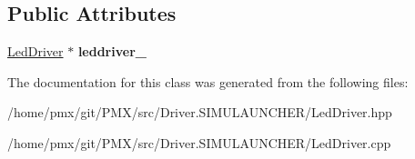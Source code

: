 \subsection*{Public Attributes}
\begin{DoxyCompactItemize}
\item 
\mbox{\label{classLedDriverSDLTask_a3671f9e532a5e7163a8a33d8059b7519}} 
\hyperlink{classLedDriver}{Led\+Driver} $\ast$ {\bfseries leddriver\+\_\+}
\end{DoxyCompactItemize}


The documentation for this class was generated from the following files\+:\begin{DoxyCompactItemize}
\item 
/home/pmx/git/\+P\+M\+X/src/\+Driver.\+S\+I\+M\+U\+L\+A\+U\+N\+C\+H\+E\+R/Led\+Driver.\+hpp\item 
/home/pmx/git/\+P\+M\+X/src/\+Driver.\+S\+I\+M\+U\+L\+A\+U\+N\+C\+H\+E\+R/Led\+Driver.\+cpp\end{DoxyCompactItemize}
